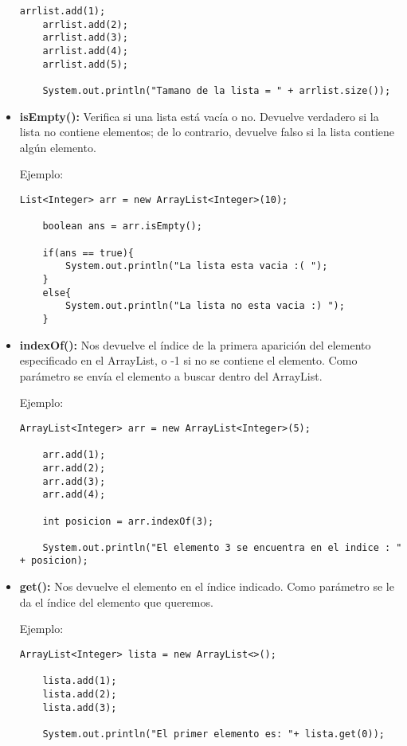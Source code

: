 \documentclass[12pt, letterpaper]{article} %
\begin{document}
\begin{itemize}
\begin{lstlisting}[frame=single]
    arrlist.add(1);
    arrlist.add(2);
    arrlist.add(3);
    arrlist.add(4);
    arrlist.add(5);

    System.out.println("Tamano de la lista = " + arrlist.size());
    \end{lstlisting}
    
    \item \textbf{isEmpty():} Verifica si una lista está vacía o no. Devuelve verdadero si la lista no contiene elementos; de lo contrario, devuelve falso si la lista contiene algún elemento.
    
    Ejemplo:
    \lstset{language = Java, breaklines=true, basicstyle=\footnotesize}
    \begin{lstlisting}[frame=single]
    List<Integer> arr = new ArrayList<Integer>(10);
    
    boolean ans = arr.isEmpty();
    
    if(ans == true){
        System.out.println("La lista esta vacia :( ");
    }
    else{
    	System.out.println("La lista no esta vacia :) ");
    }
    \end{lstlisting}

    \item \textbf{indexOf():} Nos devuelve el índice de la primera aparición del elemento especificado en el ArrayList, o -1 si no se contiene el elemento. Como parámetro se envía el elemento a buscar dentro del ArrayList.
    
    Ejemplo:
    \lstset{language = Java, breaklines=true, basicstyle=\footnotesize}
    \begin{lstlisting}[frame=single]
    ArrayList<Integer> arr = new ArrayList<Integer>(5);

    arr.add(1);
    arr.add(2);
    arr.add(3);
    arr.add(4);

    int posicion = arr.indexOf(3);

    System.out.println("El elemento 3 se encuentra en el indice : " + posicion);
    \end{lstlisting}

    \item \textbf{get():} Nos devuelve el elemento en el índice indicado. Como parámetro se le da el índice del elemento que queremos.
    
    Ejemplo:
    \lstset{language = Java, breaklines=true, basicstyle=\footnotesize}
    \begin{lstlisting}[frame=single]
    ArrayList<Integer> lista = new ArrayList<>();

    lista.add(1);
    lista.add(2);
    lista.add(3);

    System.out.println("El primer elemento es: "+ lista.get(0));
    \end{lstlisting}
\end{itemize}
\end{document}
